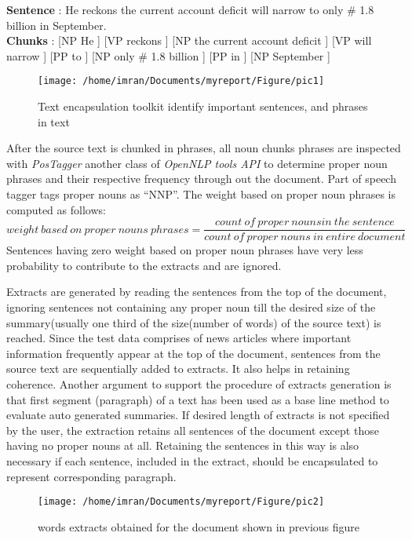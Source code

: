 \textbf{Sentence} : He reckons the current account deficit will narrow to only \# 1.8 billion in September.\\
\textbf{Chunks} : [NP He ] [VP reckons ] [NP the current account deficit ] [VP will narrow ] [PP to ] [NP only \# 1.8 billion ] [PP in ] [NP September ]

\begin{figure}[h]
 \texttt{[image: /home/imran/Documents/myreport/Figure/pic1]}
 \caption{\singlespace Text encapsulation toolkit identify important sentences, and phrases in text}
\end{figure}
\label{ch4:pnphrase}
After the source text is chunked in phrases, all noun chunks phrases are inspected with \emph{PosTagger} another class of \emph{OpenNLP tools API}
to determine proper noun phrases and their respective frequency through out the document. Part of speech tagger tags proper nouns as ``NNP''.
The weight based on proper noun phrases is computed as follows:
\begin{displaymath}
  weight\  based\ on\ proper\ nouns\  phrases = \frac{count\ of\ proper\ nouns in\ the\ sentence}
 {count\ of\ proper\ nouns\ in\ entire\ document}
\end{displaymath}
Sentences having zero weight based on proper noun phrases have very less probability to contribute to the extracts and are ignored. 

Extracts are generated by reading the sentences from the top of the document, ignoring sentences not containing any proper noun till the desired size of the summary(usually
one third of the size(number of words) of the source text) is reached. Since the test data comprises of news articles where important information frequently appear 
at the top of the document, sentences from the source text are sequentially added to extracts. It also helps in retaining coherence. Another argument to support the
procedure of extracts generation is that first segment (paragraph) of a text has been used as a base line method to evaluate auto generated summaries. If desired length
of extracts is not specified by the user, the extraction retains all sentences of the document except those having no proper nouns at all. Retaining the sentences in 
this way is also necessary if each sentence, included in the extract, should be encapsulated to represent corresponding paragraph. 

\begin{figure}[h]
 \texttt{[image: /home/imran/Documents/myreport/Figure/pic2]}
 \caption{ words extracts obtained for the document shown in previous figure}
\end{figure}
